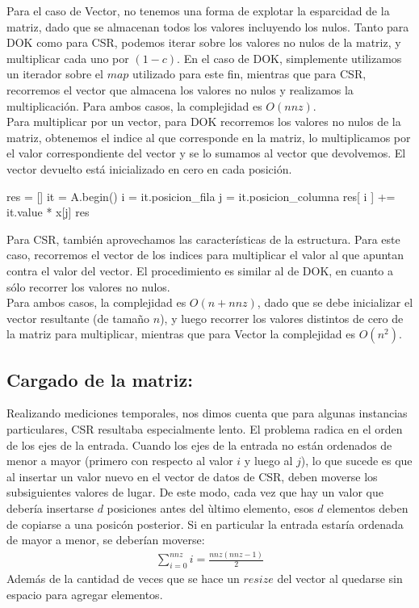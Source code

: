 Para el caso de Vector, no tenemos una forma de explotar la esparcidad de la matriz, dado que se almacenan todos los valores incluyendo los nulos. Tanto para DOK como para CSR, podemos iterar sobre los valores no nulos de la matriz, y multiplicar cada uno por $(1-c)$. En el caso de DOK, simplemente utilizamos un iterador sobre el $map$ utilizado para este fin, mientras que para CSR, recorremos el vector que almacena los valores no nulos y realizamos la multiplicación. Para ambos casos, la complejidad es $O(nnz)$. \\

Para multiplicar por un vector, para DOK recorremos los valores no nulos de la matriz, obtenemos el indice al que corresponde en la matriz, lo multiplicamos por el valor correspondiente del vector y se lo sumamos al vector que devolvemos. El vector devuelto está inicializado en cero en cada posición.


\begin{algorithmic}[1]
    \State res = []
    \State it = A.begin()
      \State i = it.posicion_fila
      \State j = it.posicion_columna
      \State res[ i ] += it.value * x[j]
    \EndWhile
    \Return res
  \EndFunction
\end{algorithmic}

Para CSR, también aprovechamos las características de la estructura. Para este caso, recorremos el vector de los indices para multiplicar el valor al que apuntan contra el valor del vector. El procedimiento es similar al de DOK, en cuanto a sólo recorrer los valores no nulos. \\

Para ambos casos, la complejidad es $O(n + nnz)$, dado que se debe inicializar el vector resultante (de tamaño $n$), y luego recorrer los valores distintos de cero de la matriz para multiplicar, mientras que para Vector la complejidad es $O(n^2)$.

\subsection{Cargado de la matriz:}
Realizando mediciones temporales, nos dimos cuenta que para algunas instancias particulares, CSR resultaba especialmente lento. El problema radica en el orden de los ejes de la entrada. Cuando los ejes de la entrada no están ordenados de menor a mayor (primero con respecto al valor $i$ y luego al $j$), lo que sucede es que al insertar un valor nuevo en el vector de datos de CSR, deben moverse los subsiguientes valores de lugar. De este modo, cada vez que hay un valor que debería insertarse $d$ posiciones antes del ùltimo elemento, esos $d$ elementos deben de copiarse a una posicón posterior. Si en particular la entrada estaría ordenada de mayor a menor, se deberían moverse:
\begin{eqnarray}
\sum_{i = 0}^{nnz} i = \frac{nnz(nnz-1)}{2}\label{eq:ecuResize}
\end{eqnarray}
Además de la cantidad de veces que se hace un $resize$ del vector al quedarse sin espacio para agregar elementos. \\

